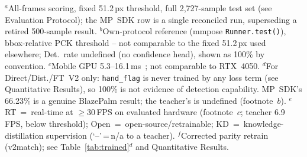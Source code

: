 \documentclass[11pt,conference,a4paper]{APSIPA2026}
\begin{document}
\begin{table}[!t]
\caption{Consolidated Model Comparison}
\label{tab:consolidated}
\centering
\renewcommand{\arraystretch}{0.92}

\vspace{3pt}
\parbox{\columnwidth}{\scriptsize $^{a}$All-frames scoring, fixed 51.2\,px
  threshold, full 2,727-sample test set (see Evaluation Protocol); the MP~SDK row is a
  single reconciled run, superseding a retired 500-sample result.
  $^{b}$Own-protocol reference (mmpose \texttt{Runner.test()}),
  bbox-relative PCK threshold -- not comparable to the fixed
  51.2\,px used elsewhere; Det.\ rate undefined (no confidence head),
  shown as 100\% by convention. $^{c}$Mobile GPU
  5.3--16.1\,ms~\cite{mediapipe2020}; not comparable to RTX~4050.
  $^{d}$For Direct/Dist./FT~V2 only: \texttt{hand\_flag} is never
  trained by any loss term (see Quantitative Results), so 100\% is not
  evidence of detection capability. MP~SDK's 66.23\% is a genuine
  BlazePalm result; the teacher's is undefined (footnote~$b$).
  $^{e}$RT~=~real-time at $\geq$30\,FPS on evaluated hardware
  (footnote~$c$; teacher 6.9\,FPS, below threshold);
  Open~=~open-source/retrainable; KD~=~knowledge-distillation
  supervision (`--'\,=\,n/a to a teacher). $^{f}$Corrected parity
  retrain (v2match); see Table~\ref{tab:trained}$^{d}$ and
  Quantitative Results.}
\end{table}
\end{document}
